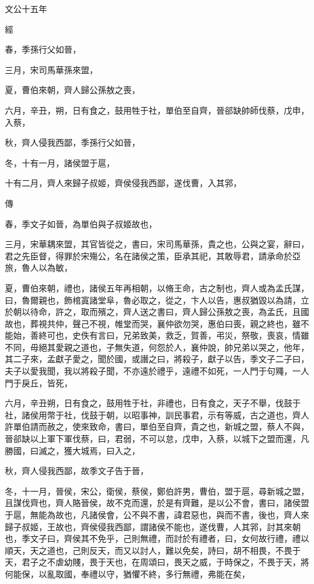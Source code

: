 \documentclass[fontset = none]{ctexart}
\begin{document}
文公十五年


經



春，季孫行父如晉，

三月，宋司馬華孫來盟，

夏，曹伯來朝，齊人歸公孫敖之喪，

六月，辛丑，朔，日有食之，鼓用牲于社，單伯至自齊，晉郤缺帥師伐蔡，戊申，入蔡，

秋，齊人侵我西鄙，季孫行父如晉，

冬，十有一月，諸侯盟于扈，

十有二月，齊人來歸子叔姬，齊侯侵我西鄙，遂伐曹，入其郛，

傳



春，季文子如晉，為單伯與子叔姬故也，

三月，宋華耦來盟，其官皆從之，書曰，宋司馬華孫，貴之也，公與之宴，辭曰，君之先臣督，得罪於宋殤公，名在諸侯之策，臣承其祀，其敢辱君，請承命於亞旅，魯人以為敏，

夏，曹伯來朝，禮也，諸侯五年再相朝，以脩王命，古之制也，齊人或為孟氏謀，曰，魯爾親也，飾棺寘諸堂阜，魯必取之，從之，卞人以告，惠叔猶毀以為請，立於朝以待命，許之，取而殯之，齊人送之書曰，齊人歸公孫敖之喪，為孟氏，且國故也，葬視共仲，聲己不視，帷堂而哭，襄仲欲勿哭，惠伯曰喪，親之終也，雖不能始，善終可也，史佚有言曰，兄弟致美，救乏，賀善，弔災，祭敬，喪哀，情雖不同，毋絕其愛親之道也，子無失道，何怨於人，襄仲說，帥兄弟以哭之，他年，其二子來，孟獻子愛之，聞於國，或譖之曰，將殺子，獻子以告，季文子二子曰，夫子以愛我聞，我以將殺子聞，不亦遠於禮乎，遠禮不如死，一人門于句鼆，一人門于戾丘，皆死，

六月，辛丑朔，日有食之，鼓用牲于社，非禮也，日有食之，天子不舉，伐鼓于社，諸侯用幣于社，伐鼓于朝，以昭事神，訓民事君，示有等威，古之道也，齊人許單伯請而赦之，使來致命，書曰，單伯至自齊，貴之也，新城之盟，蔡人不與，晉郤缺以上軍下軍伐蔡，曰，君弱，不可以怠，戊申，入蔡，以城下之盟而還，凡勝國，曰滅之，獲大城焉，曰入之，

秋，齊人侵我西鄙，故季文子告于晉，

冬，十一月，晉侯，宋公，衛侯，蔡侯，鄭伯許男，曹伯，盟于扈，尋新城之盟，且謀伐齊也，齊人賂晉侯，故不克而還，於是有齊難，是以公不會，書曰，諸侯盟于扈，無能為故也，凡諸侯會，公不與不書，諱君惡也，與而不書，後也，齊人來歸子叔姬，王故也，齊侯侵我西鄙，謂諸侯不能也，遂伐曹，人其郛，討其來朝也，季文子曰，齊侯其不免乎，己則無禮，而討於有禮者，曰，女何故行禮，禮以順天，天之道也，己則反天，而又以討人，難以免矣，詩曰，胡不相畏，不畏于天，君子之不虐幼賤，畏于天也，在周頌曰，畏天之威，于時保之，不畏于天，將何能保，以亂取國，奉禮以守，猶懼不終，多行無禮，弗能在矣，
\end{document}
